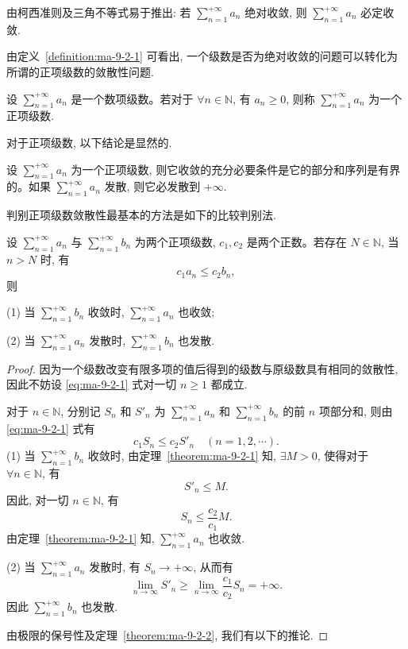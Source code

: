 由柯西准则及三角不等式易于推出: 若 $\sum\limits_{n=1}^{+\infty}a_n$ 绝对收敛, 则 $\sum\limits_{n=1}^{+\infty}a_n$ 必定收敛.

由定义~\ref{definition:ma-9-2-1} 可看出, 一个级数是否为绝对收敛的问题可以转化为所谓的正项级数的敛散性问题.

\begin{definition}\label{definition:ma-9-2-2}
设 $\sum\limits_{n=1}^{+\infty}a_n$ 是一个数项级数。若对于 $\forall n\in\mathbb N$, 有 $a_n\geq0$, 则称 $\sum\limits_{n=1}^{+\infty}a_n$ 为一个正项级数.
\end{definition}

对于正项级数, 以下结论是显然的.

\begin{theorem}\label{theorem:ma-9-2-1}
设 $\sum\limits_{n=1}^{+\infty}a_n$ 为一个正项级数, 则它收敛的充分必要条件是它的部分和序列是有界的。如果 $\sum\limits_{n=1}^{+\infty}a_n$ 发散, 则它必发散到 $+\infty$.
\end{theorem}

判别正项级数敛散性最基本的方法是如下的比较判别法.

\begin{theorem}[{比较判别法}]\label{theorem:ma-9-2-2}
设 $\sum\limits_{n=1}^{+\infty}a_n$ 与 $\sum\limits_{n=1}^{+\infty}b_n$ 为两个正项级数, $c_1,c_2$ 是两个正数。若存在 $N\in\mathbb N$, 当 $n>N$ 时, 有
\begin{equation}
  c_1a_n\leq c_2b_n,
  \label{eq:ma-9-2-1}
\end{equation}
则

(1) 当 $\sum\limits_{n=1}^{+\infty}b_n$ 收敛时, $\sum\limits_{n=1}^{+\infty}a_n$ 也收敛;

(2) 当 $\sum\limits_{n=1}^{+\infty}a_n$ 发散时, $\sum\limits_{n=1}^{+\infty}b_n$ 也发散.
\end{theorem}


\begin{proof}
因为一个级数改变有限多项的值后得到的级数与原级数具有相同的敛散性, 因此不妨设 \eqref{eq:ma-9-2-1} 式对一切 $n\geq1$ 都成立.

对于 $n\in\mathbb N$, 分别记 $S_n$ 和 $S'_n$ 为 $\sum\limits_{n=1}^{+\infty}a_n$ 和 $\sum\limits_{n=1}^{+\infty}b_n$ 的前 $n$ 项部分和, 则由 \eqref{eq:ma-9-2-1} 式有
\[
  c_1S_n\leq c_2S'_n\quad(n=1,2,\cdots).
\]
(1) 当 $\sum\limits_{n=1}^{+\infty}b_n$ 收敛时, 由定理~\ref{theorem:ma-9-2-1} 知, $\exists M>0$, 使得对于 $\forall n\in\mathbb N$, 有
\[
  S'_n\leq M.
\]
因此, 对一切 $n\in\mathbb N$, 有
\[
  S_n\leq\frac{c_2}{c_1}M.
\]
由定理~\ref{theorem:ma-9-2-1} 知, $\sum\limits_{n=1}^{+\infty}a_n$ 也收敛.

(2) 当 $\sum\limits_{n=1}^{+\infty}a_n$ 发散时, 有 $S_n\to+\infty$, 从而有
\[
  \lim_{n\to\infty}S'_n\geq\lim_{n\to\infty}\frac{c_1}{c_2}S_n=+\infty.
\]
因此 $\sum\limits_{n=1}^{+\infty}b_n$ 也发散.

由极限的保号性及定理~\ref{theorem:ma-9-2-2}, 我们有以下的推论.
\end{proof}


